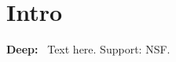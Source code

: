 \documentclass{aastex701}
\newcommand{\subsubsubsection}[1]{\textbf{#1:}~}
\newcommand{\supportfrom}[1]{Support: #1}
\begin{document}
\section{Intro}
\subsubsubsection{Deep} Text here. \supportfrom{NSF}.
\end{document}
